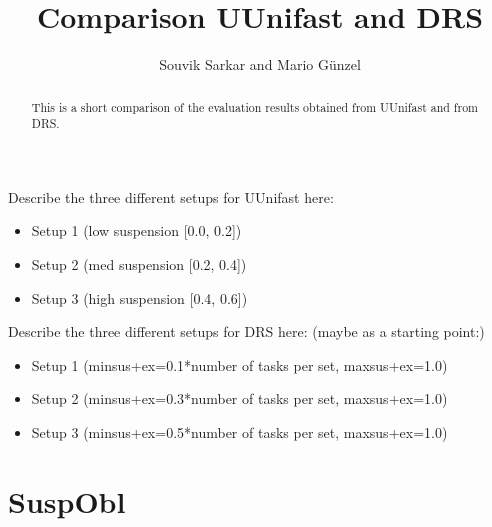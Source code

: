\documentclass[]{article}
\title{Comparison UUnifast and DRS}
\author{Souvik Sarkar and Mario Günzel}
\begin{document}
	
	\maketitle
	
	\begin{abstract}
		This is a short comparison of the evaluation results obtained from UUnifast and from DRS.
	\end{abstract}

	Describe the three different setups for UUnifast here:
	\begin{itemize}
		\item Setup 1 (low suspension [0.0, 0.2])
		\item Setup 2 (med suspension [0.2, 0.4])
		\item Setup 3 (high suspension [0.4, 0.6])
	\end{itemize}

	Describe the three different setups for DRS here:
	(maybe as a starting point:)
	\begin{itemize}
		\item Setup 1 (minsus+ex=0.1*number of tasks per set, maxsus+ex=1.0)
		\item Setup 2 (minsus+ex=0.3*number of tasks per set, maxsus+ex=1.0)
		\item Setup 3 (minsus+ex=0.5*number of tasks per set, maxsus+ex=1.0)
	\end{itemize}

	\clearpage
	\section{SuspObl}
	
\end{document}
